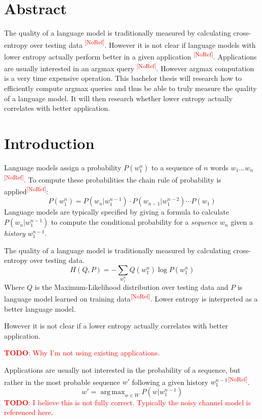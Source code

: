 \documentclass[11pt,a4paper]{article}
\title{\todo{Title}}
\author{Lukas Schmelzeisen \\ \texttt{lukas@uni-koblenz.de}}
\date{\today}
\newcommand{\todo}[1]{\textcolor{red}{\textbf{TODO}: #1}}
\newcommand{\noref}{\textcolor{red}{\small \textsuperscript{[NoRef]}}}
\DeclareMathOperator*{\argmax}{arg\,max}
\begin{document}
\maketitle

\section{Abstract}

The quality of a language model is traditionally measured by calculating
cross-entropy over testing data \noref.
However it is not clear if language models with lower entropy actually perform
better in a given application \noref.
Applications are usually interested in an argmax query \noref.
However argmax computation is a very time expensive operation.
This bachelor thesis will research how to efficiently compute argmax queries and
thus be able to truly measure the quality of a language model.
It will then research whether lower entropy actually correlates with better
application.

\section{Introduction}

Language models assign a probability $P(w_1^n)$ to a sequence of $n$
words $w_1 \ldots w_n$\noref.
To compute these probabilities the chain rule of probability is applied\noref:
\begin{equation}
  P(w_1^n) = P(w_n | w_1^{n-1}) \cdot P(w_{n-1} | w_1^{n-2}) \cdots P(w_1)
\end{equation}
Language models are typically specified by giving a formula to calculate
$P(w_n | w_1^{n-1})$ to compute the conditional probability for a
\emph{sequence} $w_n$ given a \emph{history} $w_1^{n-1}$.

The quality of a language model is traditionally measured by calculating
cross-entropy over testing data.
\begin{equation}
  H(Q,P) = - \sum_{w_1^n} Q(w_1^n) \log P(w_1^n)
\end{equation}
Where $Q$ is the Maximum-Likelihood distribution over testing data and $P$ is
language model learned on training data\noref.
Lower entropy is interpreted as a better language model.

However it is not clear if a lower entropy actually correlates with better
application.

\todo{Why I'm not using existing applications.}

Applications are usually not interested in the probability of a sequence, but
rather in the most probable sequence $w'$ following a given history
$w_1^{n-1}$\noref.
\begin{equation}
  w' = \argmax_{w \in W} P(w | w_1^{n-1})
\end{equation}
\todo{I believe this is not fully correct. Typically the noisy channel model is
referenced here}.
\end{document}
